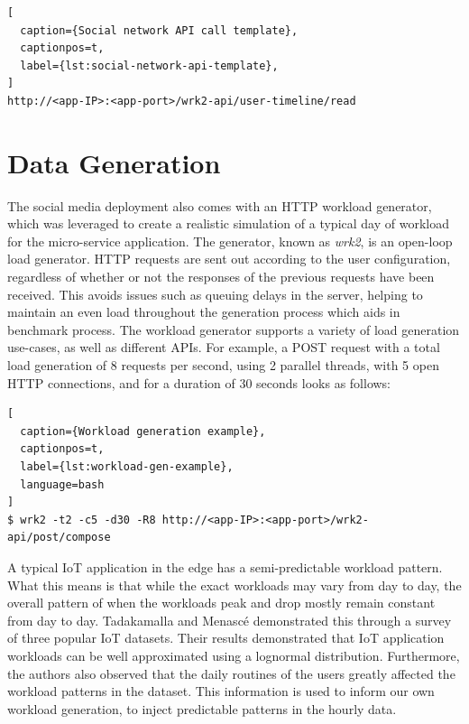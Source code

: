 \begin{lstlisting}[
  caption={Social network API call template},
  captionpos=t,
  label={lst:social-network-api-template},
]
http://<app-IP>:<app-port>/wrk2-api/user-timeline/read
\end{lstlisting}

\section{Data Generation}
\label{sec:ch5-data-generation}

The social media deployment also comes with an HTTP workload generator, which
was leveraged to create a realistic simulation of a typical day of workload for the micro-service application. The generator, known as \textit{wrk2}, is an open-loop load generator. HTTP requests are sent out according to the user configuration, regardless of whether or not the responses of the previous requests have been received. This avoids issues such as queuing delays in the server, helping to maintain an even load throughout the generation process which aids in benchmark process. The workload generator supports a variety of load generation use-cases, as well as different APIs. For example, a POST request with a total load generation of 8 requests per second, using 2 parallel threads, with 5 open HTTP connections, and for a duration of 30 seconds looks as follows:\par

\begin{lstlisting}[
  caption={Workload generation example},
  captionpos=t,
  label={lst:workload-gen-example},
  language=bash
]
$ wrk2 -t2 -c5 -d30 -R8 http://<app-IP>:<app-port>/wrk2-api/post/compose
\end{lstlisting}

A typical IoT application in the edge has a semi-predictable workload pattern. What this means is that while the exact workloads may vary from day to day, the overall pattern of when the workloads peak and drop mostly remain constant from day to day. Tadakamalla and Menasc{\'e} \cite{tadakamalla2019characterization} demonstrated this through a survey of three popular IoT datasets. Their results demonstrated that IoT application workloads can be well approximated using a lognormal distribution. Furthermore, the authors also observed that the daily routines of the users greatly affected the workload patterns in the dataset. This information is used to inform our own workload generation, to inject predictable patterns in the hourly data.\par

